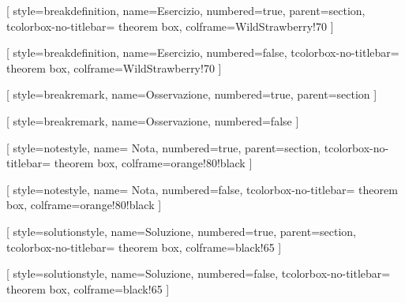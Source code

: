 
[
    style=breakdefinition,
    name=Esercizio,
    numbered=true,
    parent=section,
    tcolorbox-no-titlebar={
        theorem box,
        colframe=WildStrawberry!70
    }
]

[
    style=breakdefinition,
    name=Esercizio,
    numbered=false,
    tcolorbox-no-titlebar={
        theorem box,
        colframe=WildStrawberry!70
    }
]


[
    style=breakremark,
    name=Osservazione,
    numbered=true,
    parent=section
]

[
    style=breakremark,
    name=Osservazione,
    numbered=false
]


\newcommand{\notehandmark}{%
    \raisebox{0.05ex}{\large\ding{45}}\hspace{0.4em}%
}

[
    style=notestyle,
    name={\notehandmark Nota},
    numbered=true,
    parent=section,
    tcolorbox-no-titlebar={
        theorem box,
        colframe=orange!80!black
    }
]

[
    style=notestyle,
    name={\notehandmark Nota},
    numbered=false,
    tcolorbox-no-titlebar={
        theorem box,
        colframe=orange!80!black
    }
]


[
    style=solutionstyle,
    name=Soluzione,
    numbered=true,
    parent=section,
    tcolorbox-no-titlebar={
        theorem box,
        colframe=black!65
    }
]

[
    style=solutionstyle,
    name=Soluzione,
    numbered=false,
    tcolorbox-no-titlebar={
        theorem box,
        colframe=black!65
    }
]


\usepackage{titling}

\newcommand{\extrainfocontent}{}

\newcommand{\extrainfo}[1]{%
    \renewcommand{\extrainfocontent}{#1}%
}

